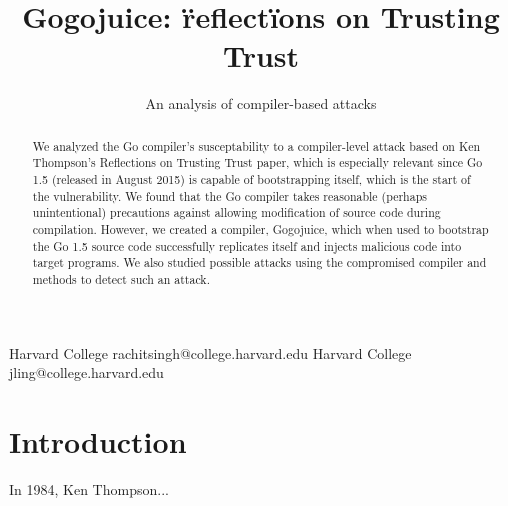 \documentclass[10pt]{sigplanconf}
\begin{document}
\setlength{\pdfpageheight}{\paperheight}
\setlength{\pdfpagewidth}{\paperwidth}






\title{Gogojuice: \"reflect\"ions on Trusting Trust}
\subtitle{An analysis of compiler-based attacks}

           {Harvard College}
           {rachitsingh@college.harvard.edu}
           {Harvard College}
           {jling@college.harvard.edu}


\begin{abstract}
We analyzed the Go compiler's susceptability to a compiler-level attack based on Ken Thompson's Reflections on Trusting Trust paper, which is especially relevant since Go 1.5 (released in August 2015) is capable of bootstrapping itself, which is the start of the vulnerability. We found that the Go compiler takes reasonable (perhaps unintentional) precautions against allowing modification of source code during compilation. However, we created a compiler, Gogojuice, which when used to bootstrap the Go 1.5 source code successfully replicates itself and injects malicious code into target programs. We also studied possible attacks using the compromised compiler and methods to detect such an attack.
\end{abstract}

\section{Introduction}
In 1984, Ken Thompson...
\end{document}
